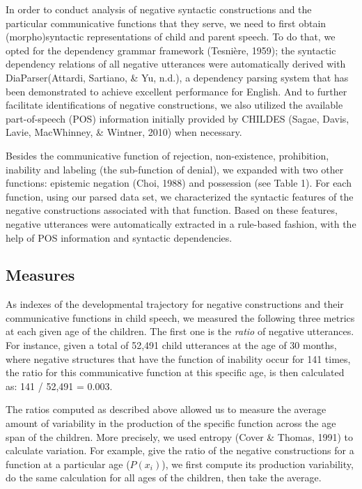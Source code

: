 \documentclass[10pt, letterpaper]{article}
\begin{document}
In order to conduct analysis of negative syntactic constructions and the
particular communicative functions that they serve, we need to first
obtain (morpho)syntactic representations of child and parent speech. To
do that, we opted for the dependency grammar framework (Tesnière, 1959);
the syntactic dependency relations of all negative utterances were
automatically derived with DiaParser(Attardi, Sartiano, \& Yu, n.d.), a
dependency parsing system that has been demonstrated to achieve
excellent performance for English. And to further facilitate
identifications of negative constructions, we also utilized the
available part-of-speech (POS) information initially provided by CHILDES
(Sagae, Davis, Lavie, MacWhinney, \& Wintner, 2010) when necessary.

Besides the communicative function of rejection, non-existence,
prohibition, inability and labeling (the sub-function of denial), we
expanded with two other functions: epistemic negation (Choi, 1988) and
possession (see Table 1). For each function, using our parsed data set,
we characterized the syntactic features of the negative constructions
associated with that function. Based on these features, negative
utterances were automatically extracted in a rule-based fashion, with
the help of POS information and syntactic dependencies.

\hypertarget{measures}{%
\subsection{Measures}\label{measures}}

As indexes of the developmental trajectory for negative constructions
and their communicative functions in child speech, we measured the
following three metrics at each given age of the children. The first one
is the \emph{ratio} of negative utterances. For instance, given a total
of 52,491 child utterances at the age of 30 months, where negative
structures that have the function of inability occur for 141 times, the
ratio for this communicative function at this specific age, is then
calculated as: 141 / 52,491 = 0.003.

The ratios computed as described above allowed us to measure the average
amount of variability in the production of the specific function across
the age span of the children. More precisely, we used entropy (Cover \&
Thomas, 1991) to calculate variation. For example, give the ratio of the
negative constructions for a function at a particular age (\(P(x_i)\)),
we first compute its production variability, do the same calculation for
all ages of the children, then take the average.
\end{document}
